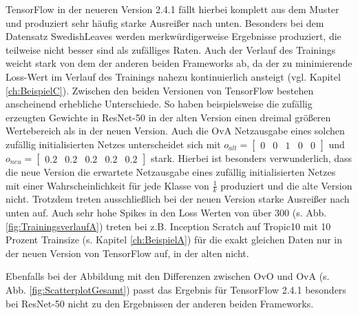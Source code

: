 TensorFlow \cite{tensorflow} in der neueren Version 2.4.1 fällt hierbei komplett aus dem Muster und produziert sehr häufig starke Ausreißer nach unten. Besonders bei dem Datensatz SwedishLeaves \cite{swedishLeaves} werden merkwürdigerweise Ergebnisse produziert, die teilweise nicht besser sind als zufälliges Raten. Auch der Verlauf des Trainings weicht stark von dem der anderen beiden Frameworks ab, da der zu minimierende Loss-Wert im Verlauf des Trainings nahezu kontinuierlich ansteigt (vgl. Kapitel \ref{ch:BeispielC}).
Zwischen den beiden Versionen von TensorFlow \cite{tensorflow} bestehen anscheinend erhebliche Unterschiede. So haben beispielsweise die zufällig erzeugten Gewichte in ResNet-50 in der alten Version einen dreimal größeren Wertebereich als in der neuen Version. Auch die OvA Netzausgabe eines solchen zufällig initialisierten Netzes unterscheidet sich mit $o_{alt}=\begin{bmatrix}
0 & 0 & 1 & 0 & 0
\end{bmatrix}$ und $o_{neu}=\begin{bmatrix}
0.2 & 0.2 & 0.2 & 0.2 & 0.2
\end{bmatrix}$ stark. Hierbei ist besonders verwunderlich, dass die neue Version die erwartete Netzausgabe eines zufällig initialisierten Netzes mit einer Wahrscheinlichkeit für jede Klasse von $\frac{1}{k}$ produziert und die alte Version nicht. Trotzdem treten ausschließlich bei der neuen Version starke Ausreißer nach unten auf. Auch sehr hohe Spikes in den Loss Werten von über 300 (s. Abb. \ref{fig:TrainingsverlaufA}) treten bei z.B. Inception Scratch auf Tropic10 mit 10 Prozent Trainsize (s. Kapitel \ref{ch:BeispielA}) für die exakt gleichen Daten nur in der neuen Version von TensorFlow \cite{tensorflow} auf, in der alten nicht.


Ebenfalls bei der Abbildung mit den Differenzen zwischen OvO und OvA (s. Abb. \ref{fig:ScatterplotGesamt}) passt das Ergebnis für TensorFlow 2.4.1 \cite{tensorflow} besonders bei ResNet-50 nicht zu den Ergebnissen der anderen beiden Frameworks.\\


